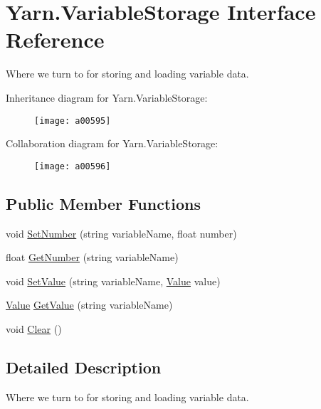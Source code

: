 \hypertarget{a00184}{\section{Yarn.\-Variable\-Storage Interface Reference}
\label{a00184}
}


Where we turn to for storing and loading variable data.  




Inheritance diagram for Yarn.\-Variable\-Storage\-:
\nopagebreak
\begin{figure}[H]
\begin{center}
\leavevmode
\texttt{[image: a00595]}
\end{center}
\end{figure}


Collaboration diagram for Yarn.\-Variable\-Storage\-:
\nopagebreak
\begin{figure}[H]
\begin{center}
\leavevmode
\texttt{[image: a00596]}
\end{center}
\end{figure}
\subsection*{Public Member Functions}
\begin{DoxyCompactItemize}
\item 
void \hyperlink{a00184_aa28c3694f985cf73489efc301b9d41dd}{Set\-Number} (string variable\-Name, float number)
\item 
float \hyperlink{a00184_a04b061c52d8ac814ce559da5286fbc71}{Get\-Number} (string variable\-Name)
\item 
void \hyperlink{a00184_aa90ff61224432c5ed3ce72199c55f440}{Set\-Value} (string variable\-Name, \hyperlink{a00181}{Value} value)
\item 
\hyperlink{a00181}{Value} \hyperlink{a00184_accab1fc5c8fc353dbfc53ca0f4029576}{Get\-Value} (string variable\-Name)
\item 
void \hyperlink{a00184_af98c1e41f351cb96e13f668ca2fd9d92}{Clear} ()
\end{DoxyCompactItemize}


\subsection{Detailed Description}
Where we turn to for storing and loading variable data. 

